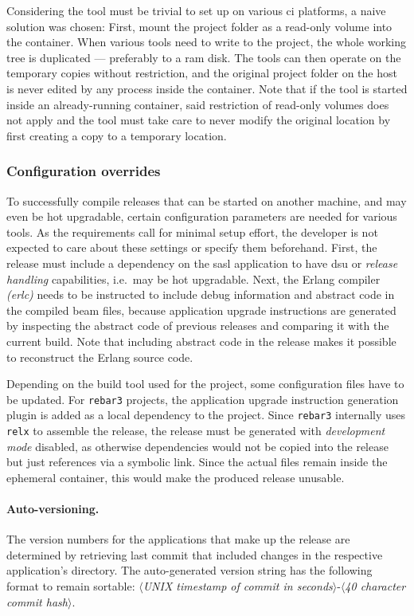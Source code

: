 Considering the tool must be trivial to set up on various \acrshort{ci} platforms, a naive solution was chosen: First, mount the project folder as a read-only volume into the container. When various tools need to write to the project, the whole working tree is duplicated --- preferably to a \acrshort{ram} disk. The tools can then operate on the temporary copies without restriction, and the original project folder on the host is never edited by any process inside the container. Note that if the tool is started inside an already-running container, said restriction of read-only volumes does not apply and the tool must take care to never modify the original location by first creating a copy to a temporary location.


\subsubsection{Configuration overrides} To successfully compile releases that can be started on another machine, and may even be hot upgradable, certain configuration parameters are needed for various tools. As the requirements call for minimal setup effort, the developer is not expected to care about these settings or specify them beforehand. First, the release must include a dependency on the \acrfull{sasl} application to have \acrshort{dsu} or \emph{release handling} capabilities, i.e.~may be hot upgradable. Next, the Erlang compiler \emph{(erlc)} needs to be instructed to include debug information and abstract code in the compiled \acrshort{beam} files, because application upgrade instructions are generated by inspecting the abstract code of previous releases and comparing it with the current build. Note that including abstract code in the release makes it possible to reconstruct the Erlang source code.~\cite{doc:otp}

Depending on the build tool used for the project, some configuration files have to be updated. For \lstinline|rebar3| projects, the application upgrade instruction generation plugin is added as a local dependency to the project. Since \lstinline|rebar3| internally uses \lstinline|relx| to assemble the release, the release must be generated with \emph{development mode} disabled, as otherwise dependencies would not be copied into the release but just references via a symbolic link. Since the actual files remain inside the ephemeral container, this would make the produced release unusable.

\paragraph{Auto-versioning.} The version numbers for the applications that make up the release are determined by retrieving last commit that included changes in the respective application's directory. The auto-generated version string has the following format to remain sortable: $\langle$\emph{UNIX timestamp of commit in seconds}$\rangle$-$\langle$\emph{40 character commit hash}$\rangle$.

